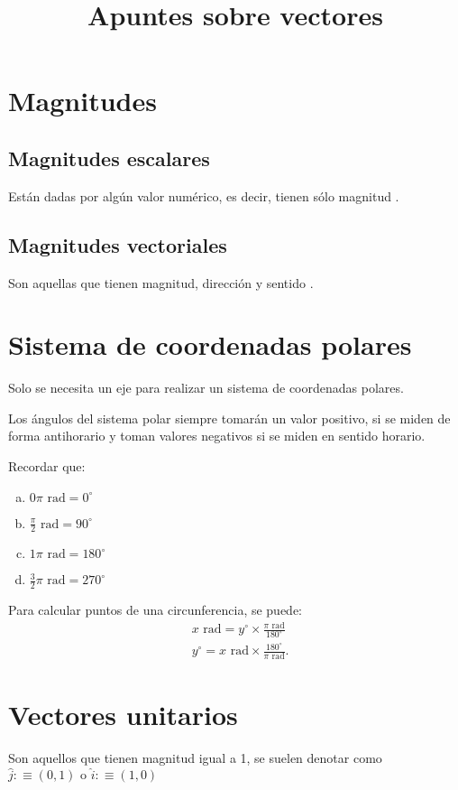 \documentclass[12pt]{article}
\begin{document}
\title{Apuntes sobre vectores}
\maketitle
\newpage
\tableofcontents
\newpage
\section{Magnitudes}
	\subsection{Magnitudes escalares}
		Están dadas por algún valor numérico, es decir, tienen \color{red} sólo magnitud \color{black}.
	\subsection{Magnitudes vectoriales}
 	Son aquellas que tienen \color{red} magnitud, dirección y sentido \color{black}.
\section{Sistema de coordenadas polares}
Solo se necesita un eje para realizar un sistema de coordenadas polares.

Los ángulos del sistema polar siempre tomarán un valor positivo, si se miden de forma antihorario y toman valores negativos si se miden en sentido horario.

Recordar que: 
	\begin{enumerate}[a), leftmargin=2cm]
		\item $0 \pi  \text{ rad} = 0^{\circ}$
		\item $\frac{\pi}{2}  \text{ rad} = 90^{\circ}$
		\item $1 \pi  \text{ rad} = 180^{\circ}$
		\item $\frac{3}{2} \pi \text{ rad} = 270^{\circ}$
	\end{enumerate}

Para calcular puntos de una circunferencia, se puede:
	\begin{align*}
		& x \text{ rad} = y^{\circ} \times \frac{\pi \text{ rad}}{180^{\circ}} \\ 
		& y^{\circ} = x \text{ rad} \times \frac{180^{\circ}}{\pi \text{ rad}}.
	\end{align*}	 
\newpage
\section{Vectores unitarios}
 Son aquellos que tienen magnitud igual a 1, se suelen denotar como $\hat{j}:\equiv (0,1) \text{ o } \hat{i} :\equiv (1,0)$
 
\end{document}
